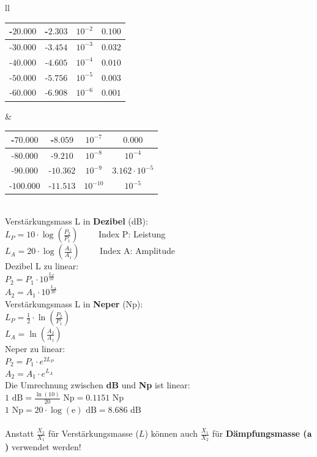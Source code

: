 \begin{tabular}{ll}
{\begin{tabular}{|c|c|c|c|}
	-$20.000$ & -$2.303$ & $10^{-2}$ & $0.100$ \\ \hline
	-$30.000$ & -$3.454$ & $10^{-3}$ & $0.032$ \\ \hline
	-$40.000$ & -$4.605$ & $10^{-4}$ & $0.010$ \\ \hline
	-$50.000$ & -$5.756$ & $10^{-5}$ & $0.003$ \\ \hline
	-$60.000$ & -$6.908$ & $10^{-6}$ & $0.001$ \\ \hline
	\end{tabular}
}
& \parbox{11.5cm}{
	\scriptsize
	\begin{tabular}{|c|c|c|c|}
	\hline
	-$70.000$ & -$8.059$ & $10^{-7}$ & $0.000$ \\ \hline
	-$80.000$ & -$9.210$ & $10^{-8}$ & $10^{-4}$ \\ \hline
	-$90.000$ & -$10.362$ & $10^{-9}$ & $3.162 \cdot 10^{-5}$ \\ \hline
	-$100.000$ & -$11.513$ & $10^{-10}$ & $10^{-5}$ \\ \hline
	\end{tabular} \\
	\normalsize
Verstärkungsmass L in \textbf{Dezibel} (dB):\\
$L_P = 10 \cdot \log \left(\frac {P_2} {P_1}\right) \qquad$ Index P: Leistung \\
$L_A = 20 \cdot \log \left(\frac {A_2} {A_1}\right) \qquad$ Index A: Amplitude \\ 

Dezibel L zu linear: \\
$P_2 = P_1 \cdot 10^{\frac{L_P}{10}} $ \\
$A_2 = A_1 \cdot 10^{\frac{L_A}{20}} $ \\

Verstärkungsmass L in \textbf{Neper} (Np):\\
$L_P = \frac {1}{2} \cdot \ln \left(\frac {P_2} {P_1}\right)$\\
$L_A = \ln \left(\frac {A_2} {A_1} \right)$ \\

Neper zu linear: \\
$P_2 = P_1 \cdot e^{2 L_P}$ \\
$A_2 = A_1 \cdot e^{L_A}$ \\

Die Umrechnung zwischen {\bf dB} und {\bf Np} ist linear: \\
$1\mbox{~dB} = \frac {\ln(10)} {20} \mbox{~Np} = 0.1151\mbox{~Np}$ \\
$1\mbox{~Np} = 20 \cdot \log(\mbox{e}) \mbox{~dB} = 8.686\mbox{~dB}$ \\ 
\\
Anstatt $\frac{X_2}{X_1}$ für Verstärkungsmasse ($L$) können auch
$\frac{X_1}{X_2}$ für \textbf{Dämpfungsmasse ($\bf{a}$)} verwendet werden!

}
\end{tabular}
